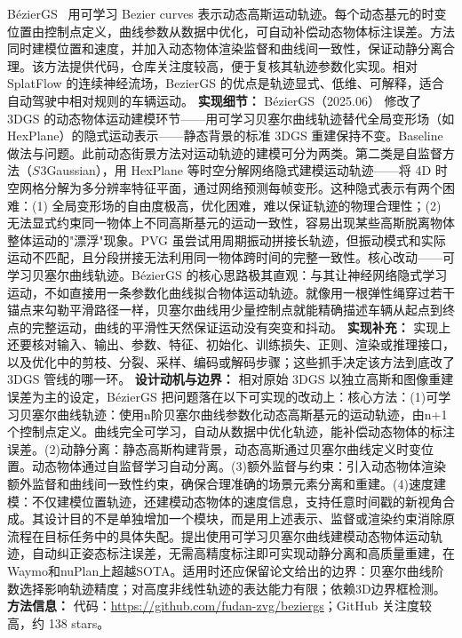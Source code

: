 BézierGS~\cite{2506_22099} 用可学习 Bezier curves 表示动态高斯运动轨迹。每个动态基元的时变位置由控制点定义，曲线参数从数据中优化，可自动补偿动态物体标注误差。方法同时建模位置和速度，并加入动态物体渲染监督和曲线间一致性，保证动静分离合理。该方法提供代码，仓库关注度较高，便于复核其轨迹参数化实现。相对 SplatFlow 的连续神经流场，BezierGS 的优点是轨迹显式、低维、可解释，适合自动驾驶中相对规则的车辆运动。
\textbf{实现细节：} B\'ezierGS（2025.06） 修改了 3DGS 的动态物体运动建模环节——用可学习贝塞尔曲线轨迹替代全局变形场（如 HexPlane）的隐式运动表示——静态背景的标准 3DGS 重建保持不变。Baseline 做法与问题。此前动态街景方法对运动轨迹的建模可分为两类。第二类是自监督方法（$S^{}3$Gaussian），用 HexPlane 等时空分解网络隐式建模运动轨迹——将 4D 时空网格分解为多分辨率特征平面，通过网络预测每帧变形。这种隐式表示有两个困难：(1) 全局变形场的自由度极高，优化困难，难以保证轨迹的物理合理性；(2) 无法显式约束同一物体上不同高斯基元的运动一致性，容易出现某些高斯脱离物体整体运动的"漂浮"现象。PVG 虽尝试用周期振动拼接长轨迹，但振动模式和实际运动不匹配，且分段拼接无法利用同一物体跨时间的完整一致性。核心改动——可学习贝塞尔曲线轨迹。B\'ezierGS 的核心思路极其直观：与其让神经网络隐式学习运动，不如直接用一条参数化曲线拟合物体运动轨迹。就像用一根弹性绳穿过若干锚点来勾勒平滑路径一样，贝塞尔曲线用少量控制点就能精确描述车辆从起点到终点的完整运动，曲线的平滑性天然保证运动没有突变和抖动。
\textbf{实现补充：} 实现上还要核对输入、输出、参数、特征、初始化、训练损失、正则、渲染或推理接口，以及优化中的剪枝、分裂、采样、编码或解码步骤；这些抓手决定该方法到底改了 3DGS 管线的哪一环。
\textbf{设计动机与边界：} 相对原始 3DGS 以独立高斯和图像重建误差为主的设定，BézierGS 把问题落在以下可实现的改动上：核心方法：(1)可学习贝塞尔曲线轨迹：使用n阶贝塞尔曲线参数化动态高斯基元的运动轨迹，由n+1个控制点定义。曲线完全可学习，自动从数据中优化轨迹，能补偿动态物体的标注误差。(2)动静分离：静态高斯构建背景，动态高斯通过贝塞尔曲线定义时变位置。动态物体通过自监督学习自动分离。(3)额外监督与约束：引入动态物体渲染额外监督和曲线间一致性约束，确保合理准确的场景元素分离和重建。(4)速度建模：不仅建模位置轨迹，还建模动态物体的速度信息，支持任意时间戳的新视角合成。其设计目的不是单独增加一个模块，而是用上述表示、监督或渲染约束消除原流程在目标任务中的具体失配。提出使用可学习贝塞尔曲线建模动态物体运动轨迹，自动纠正姿态标注误差，无需高精度标注即可实现动静分离和高质量重建，在Waymo和nuPlan上超越SOTA。适用时还应保留论文给出的边界：贝塞尔曲线阶数选择影响轨迹精度；对高度非线性轨迹的表达能力有限；依赖3D边界框检测。
\textbf{方法信息：} 代码：\url{https://github.com/fudan-zvg/beziergs}；GitHub 关注度较高，约 138 stars。




